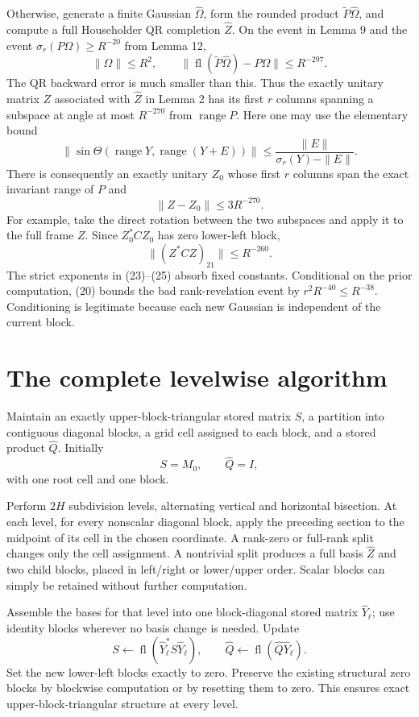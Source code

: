 \documentclass[10pt,a4paper]{article}
\begin{document}
Otherwise, generate a finite Gaussian \(\widehat\Omega\), form the
rounded product \(\widetilde P\widehat\Omega\), and compute a full
Householder QR completion \(\widehat Z\). On the event in Lemma 9 and
the event \(\sigma_r(P\Omega)\ge R^{-20}\) from Lemma 12, \[
 \|\Omega\|\le R^2,
 \qquad
 \|\operatorname{fl}(\widetilde P\widehat\Omega)-P\Omega\|
 \le R^{-297}.
 \tag{23}
\] The QR backward error is much smaller than this. Thus the exactly
unitary matrix \(Z\) associated with \(\widehat Z\) in Lemma 2 has its
first \(r\) columns spanning a subspace at angle at most \(R^{-270}\)
from \(\operatorname{range}P\). Here one may use the elementary bound \[
 \|\sin\Theta(\operatorname{range}Y,\operatorname{range}(Y+E))\|
 \le \frac{\|E\|}{\sigma_r(Y)-\|E\|}.
\] There is consequently an exactly unitary \(Z_0\) whose first \(r\)
columns span the exact invariant range of \(P\) and \[
 \|Z-Z_0\|\le3R^{-270}.
 \tag{24}
\] For example, take the direct rotation between the two subspaces and
apply it to the full frame \(Z\). Since \(Z_0^*CZ_0\) has zero
lower-left block, \[
 \|(Z^*CZ)_{21}\|\le R^{-260}.
 \tag{25}
\] The strict exponents in (23)--(25) absorb fixed constants.
Conditional on the prior computation, (20) bounds the bad
rank-revelation event by \(r^2R^{-40}\le R^{-38}\). Conditioning is
legitimate because each new Gaussian is independent of the current
block.

\section{The complete levelwise
algorithm}\label{the-complete-levelwise-algorithm}

Maintain an exactly upper-block-triangular stored matrix \(S\), a
partition into contiguous diagonal blocks, a grid cell assigned to each
block, and a stored product \(\widehat Q\). Initially \[
 S=M_0,\qquad\widehat Q=I,
\] with one root cell and one block.

Perform \(2H\) subdivision levels, alternating vertical and horizontal
bisection. At each level, for every nonscalar diagonal block, apply the
preceding section to the midpoint of its cell in the chosen coordinate.
A rank-zero or full-rank split changes only the cell assignment. A
nontrivial split produces a full basis \(\widehat Z\) and two child
blocks, placed in left/right or lower/upper order. Scalar blocks can
simply be retained without further computation.

Assemble the bases for that level into one block-diagonal stored matrix
\(\widehat Y_\ell\); use identity blocks wherever no basis change is
needed. Update \[
 S\leftarrow\operatorname{fl}(\widehat Y_\ell^*S\widehat Y_\ell),
 \qquad
 \widehat Q\leftarrow\operatorname{fl}(\widehat Q\widehat Y_\ell).
 \tag{26}
\] Set the new lower-left blocks exactly to zero. Preserve the existing
structural zero blocks by blockwise computation or by resetting them to
zero. This ensures exact upper-block-triangular structure at every
level.
\end{document}
